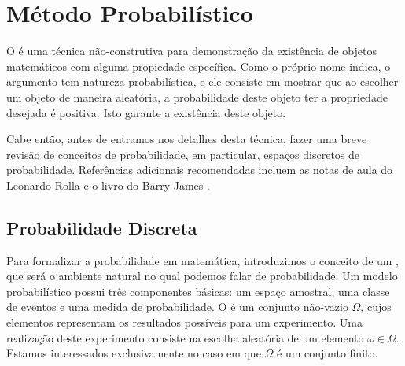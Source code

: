 
\chapter{Método Probabilístico}
\label{chap:prob}


O  é uma técnica não-construtiva para demonstração da existência de objetos matemáticos com alguma propiedade específica. Como o próprio nome indica, o argumento tem natureza probabilística, e ele consiste em mostrar que ao escolher um objeto de maneira aleatória, a probabilidade deste objeto ter a propriedade desejada é positiva. Isto garante a existência deste objeto.

Cabe então, antes de entramos nos detalhes desta técnica, fazer uma breve revisão de conceitos de probabilidade, em particular, espaços discretos de probabilidade. Referências adicionais recomendadas incluem as notas de aula do Leonardo Rolla \cite{rolla} e o livro do Barry James \cite{barryjames}.


\section{Probabilidade Discreta}

Para formalizar a probabilidade em matemática, introduzimos o conceito de um , que será o ambiente natural no qual podemos falar de probabilidade.
Um modelo probabilístico possui três componentes básicas: um espaço amostral, uma classe de eventos e uma medida de probabilidade. O  é um conjunto não-vazio $\Omega$, cujos elementos representam os resultados possíveis para um experimento. Uma realização deste experimento consiste na escolha aleatória de um elemento $\omega \in \Omega$. Estamos interessados exclusivamente no caso em que $\Omega$ é um conjunto finito.

